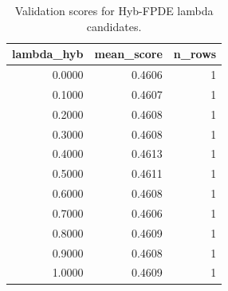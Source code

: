\begin{table}[t]
\caption{Validation scores for Hyb-FPDE lambda candidates.}
\label{tab:lambda_distribution_computed}
\centering
\begin{tabular}{rrr}
\toprule
lambda\_hyb & mean\_score & n\_rows \\
\midrule
0.0000 & 0.4606 & 1 \\
0.1000 & 0.4607 & 1 \\
0.2000 & 0.4608 & 1 \\
0.3000 & 0.4608 & 1 \\
0.4000 & 0.4613 & 1 \\
0.5000 & 0.4611 & 1 \\
0.6000 & 0.4608 & 1 \\
0.7000 & 0.4606 & 1 \\
0.8000 & 0.4609 & 1 \\
0.9000 & 0.4608 & 1 \\
1.0000 & 0.4609 & 1 \\
\bottomrule
\end{tabular}

\end{table}
